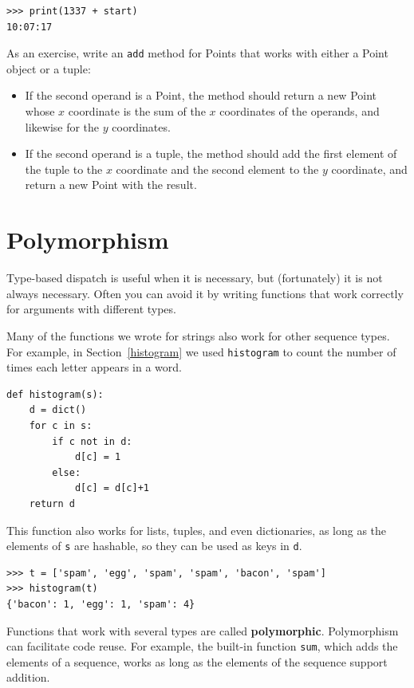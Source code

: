 \documentclass[10pt]{book}
\begin{document}
\begin{verbatim}
>>> print(1337 + start)
10:07:17
\end{verbatim}
%

As an exercise, write an {\tt add} method for Points that works with
either a Point object or a tuple:

\begin{itemize}

\item If the second operand is a Point, the method should return a new
Point whose $x$ coordinate is the sum of the $x$ coordinates of the
operands, and likewise for the $y$ coordinates.

\item If the second operand is a tuple, the method should add the
first element of the tuple to the $x$ coordinate and the second
element to the $y$ coordinate, and return a new Point with the result.

\end{itemize}




\section{Polymorphism}
\label{polymorphism}

Type-based dispatch is useful when it is necessary, but (fortunately)
it is not always necessary.  Often you can avoid it by writing functions
that work correctly for arguments with different types.

Many of the functions we wrote for strings also
work for other sequence types.
For example, in Section~\ref{histogram}
we used {\tt histogram} to count the number of times each letter
appears in a word.

\begin{verbatim}
def histogram(s):
    d = dict()
    for c in s:
        if c not in d:
            d[c] = 1
        else:
            d[c] = d[c]+1
    return d
\end{verbatim}
%
This function also works for lists, tuples, and even dictionaries,
as long as the elements of {\tt s} are hashable, so they can be used
as keys in {\tt d}.

\begin{verbatim}
>>> t = ['spam', 'egg', 'spam', 'spam', 'bacon', 'spam']
>>> histogram(t)
{'bacon': 1, 'egg': 1, 'spam': 4}
\end{verbatim}
%
Functions that work with several types are called {\bf polymorphic}.
Polymorphism can facilitate code reuse.  For example, the built-in
function {\tt sum}, which adds the elements of a sequence, works
as long as the elements of the sequence support addition.
\end{document}
